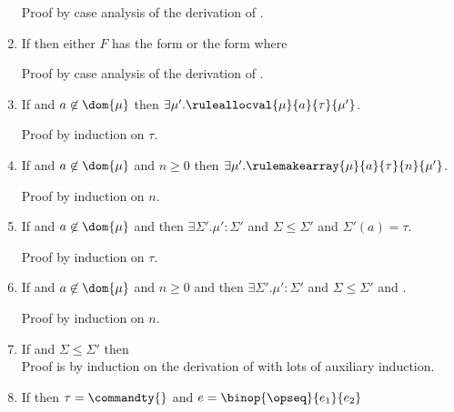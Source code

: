 \begin{enumerate}
  Proof by case analysis of the derivation of .

\item \label{stackvarshape} If  then either $F$ has the form  or the form  where 

  Proof by case analysis of the derivation of .

\item \label{allocprogress} If  and $a \not\in \dom{\mu}$ then $\exists \mu' . \ruleallocval{\mu}{a}{\tau}{\mu'}$.

  Proof by induction on $\tau$.

\item \label{allocarrayprogress} If  and $a \not\in \dom{\mu}$ and $n \ge 0$ then $\exists \mu' . \rulemakearray{\mu}{a}{\tau}{n}{\mu'}$.

  Proof by induction on $n$.

\item \label{allocpres} If  and $a \not\in \dom{\mu}$ and  then $\exists \Sigma'. \mu' : \Sigma'$ and $\Sigma \le \Sigma'$ and $\Sigma'(a) = \tau$.

  Proof by induction on $\tau$.

\item \label{allocarraypres} If  and $a \not\in \dom{\mu}$ and $n \ge 0$ and  then $\exists \Sigma'.\mu' : \Sigma'$ and $\Sigma \le \Sigma'$ and .

  Proof by induction on $n$.

\item \label{allocsafety} If  and $\Sigma \le \Sigma'$ then  \\

  Proof is by induction on the derivation of  with lots of auxiliary induction.

\item \label{ependingcmd}
  If  then $\tau = \commandty{}$ and $e = \binop{\opseq}{e_1}{e_2}$


\end{enumerate}
